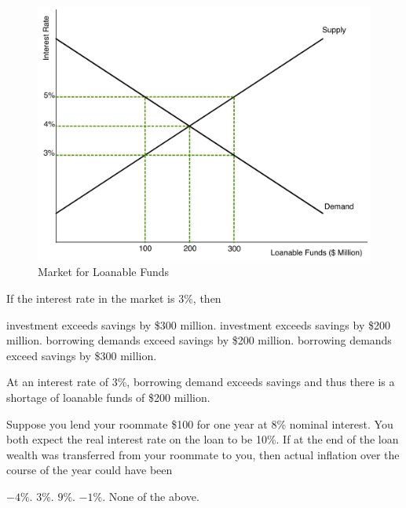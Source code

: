 \documentclass[addpoints,11pt]{exam}
\theoremstyle{definition}
\begin{document}
\begin{questions}
	
	\begin{figure}[H]
		\centering
		\includegraphics[scale=.38]{Exam2_MC27.pdf}
		\caption{Market for Loanable Funds}
		\label{MC27}
	\end{figure}

	If the interest rate in the market is 3\%, then 
	
	\begin{choices}
		\choice investment exceeds savings by \$300 million.
		\choice investment exceeds savings by \$200 million.
		\CorrectChoice borrowing demands exceed savings by \$200 million.
		\choice borrowing demands exceed savings by \$300 million.
	\end{choices}
	
	\begin{solution}
		 At an interest rate of 3\%, borrowing demand exceeds savings and thus there is a shortage of loanable funds of \$200 million.
	\end{solution}
	
\newpage
	
	\question Suppose you lend your roommate \$100 for one year at 8\% nominal interest. You both expect the real interest rate on the loan to be 10\%. If at the end of the loan wealth was transferred from your roommate to you, then actual inflation over the course of the year could have been
		
		\begin{choices}
			\CorrectChoice $-4\%$.
			\choice $3\%$.
			\choice $9\%$.
			\choice $-1\%$.
			\choice None of the above.
		\end{choices}
		

\end{questions}
\end{document}
